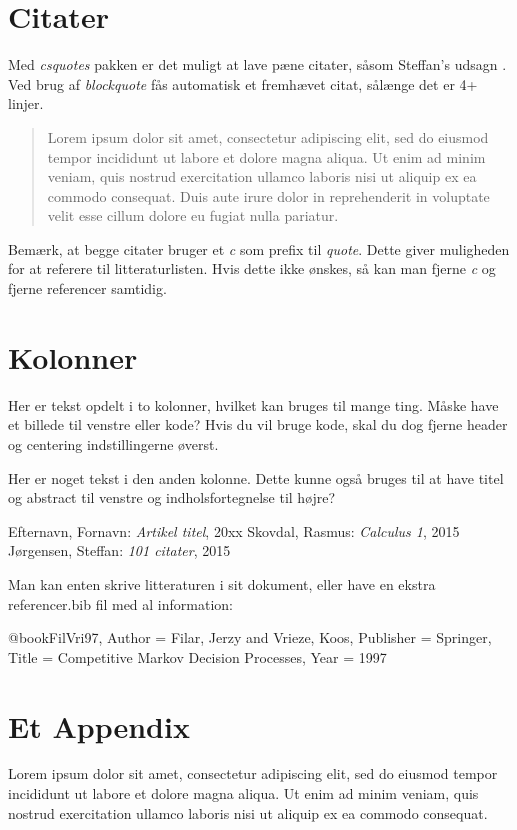 \documentclass[a4, danish]{article}
\begin{document}
\section{Citater}
Med \emph{csquotes} pakken er det muligt at lave pæne citater, såsom Steffan's udsagn . Ved brug af \emph{blockquote} fås automatisk et fremhævet citat, sålænge det er 4+ linjer.

\blockcquote[s. 1]{bibEks}{Lorem ipsum dolor sit amet, consectetur adipiscing elit, sed do eiusmod tempor incididunt ut labore et dolore magna aliqua. Ut enim ad minim veniam, quis nostrud exercitation ullamco laboris nisi ut aliquip ex ea commodo consequat. Duis aute irure dolor in reprehenderit in voluptate velit esse cillum dolore eu fugiat nulla pariatur.}

Bemærk, at begge citater bruger et \emph{c} som prefix til \emph{quote}. Dette giver muligheden for at referere til litteraturlisten. Hvis dette ikke ønskes, så kan man fjerne \emph{c} og fjerne referencer samtidig.

\newpage
\section{Kolonner}
\begin{multicols}{2}

\noindent Her er tekst opdelt i to kolonner, hvilket kan bruges til mange ting. Måske have et billede til venstre eller kode? Hvis du vil bruge kode, skal du dog fjerne header og centering indstillingerne øverst.

\vfill \columnbreak

Her er noget tekst i den anden kolonne. Dette kunne også bruges til at have titel og abstract til venstre og indholsfortegnelse til højre?

\end{multicols}

\begin{thebibliography}{9}
 Efternavn, Fornavn: \emph{Artikel titel}, 20xx
 Skovdal, Rasmus: \emph{Calculus 1}, 2015
 Jørgensen, Steffan: \emph{101 citater}, 2015

 Man kan enten skrive litteraturen i sit dokument, eller have en ekstra referencer.bib fil med al information:

@book{FilVri97,
Author = {Filar, Jerzy and Vrieze, Koos},
Publisher = {Springer},
Title = {Competitive Markov Decision Processes},
Year = 1997
} 
 
\end{thebibliography}



\newpage
\appendix
\section{Et Appendix}
Lorem ipsum dolor sit amet, consectetur adipiscing elit, sed do eiusmod tempor incididunt ut labore et dolore magna aliqua. Ut enim ad minim veniam, quis nostrud exercitation ullamco laboris nisi ut aliquip ex ea commodo consequat.
\end{document}
